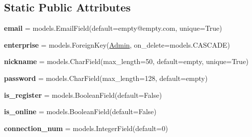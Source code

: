 \subsection*{Static Public Attributes}
\begin{DoxyCompactItemize}
\item 
\mbox{\label{classbackend_1_1models_1_1_customer_service_afd84cb13b4f13da507c1ac1d705a4a47}} 
{\bfseries email} = models.\+Email\+Field(default=\textquotesingle{}empty@empty.\+com\textquotesingle{}, unique=True)
\item 
\mbox{\label{classbackend_1_1models_1_1_customer_service_a23475a354ede9af46120e17cc346da96}} 
{\bfseries enterprise} = models.\+Foreign\+Key(\textquotesingle{}\hyperlink{classbackend_1_1models_1_1_admin}{Admin}\textquotesingle{}, on\+\_\+delete=models.\+C\+A\+S\+C\+A\+DE)
\item 
\mbox{\label{classbackend_1_1models_1_1_customer_service_a51b7fbd597da23c46ffa48acd37a6730}} 
{\bfseries nickname} = models.\+Char\+Field(max\+\_\+length=50, default=\textquotesingle{}empty\textquotesingle{}, unique=True)
\item 
\mbox{\label{classbackend_1_1models_1_1_customer_service_a7aba2934fc1089c3b6730099b744debd}} 
{\bfseries password} = models.\+Char\+Field(max\+\_\+length=128, default=\textquotesingle{}empty\textquotesingle{})
\item 
\mbox{\label{classbackend_1_1models_1_1_customer_service_a316a7ce100879a6fb27a8d202a857ab9}} 
{\bfseries is\+\_\+register} = models.\+Boolean\+Field(default=False)
\item 
\mbox{\label{classbackend_1_1models_1_1_customer_service_a35d1452178e9d8ce83e0abaebbcfa060}} 
{\bfseries is\+\_\+online} = models.\+Boolean\+Field(default=False)
\item 
\mbox{\label{classbackend_1_1models_1_1_customer_service_a2ac1c6d11ccc775f4a8c40ddd436967d}} 
{\bfseries connection\+\_\+num} = models.\+Integer\+Field(default=0)

\end{DoxyCompactItemize}
